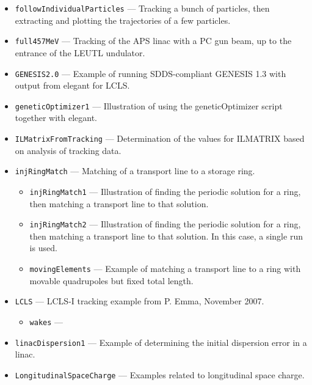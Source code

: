 \begin{itemize}
\begin{itemize}
\end{itemize}
\item \verb|followIndividualParticles| --- 
Tracking a bunch of particles, then extracting and plotting the trajectories of a few particles.

\item \verb|full457MeV| --- 
 Tracking of the APS linac with a PC gun beam, up to the entrance of the LEUTL undulator. 

\item \verb|GENESIS2.0| --- 
 Example of running SDDS-compliant GENESIS 1.3 with output from elegant for LCLS. 

\item \verb|geneticOptimizer1| --- 
 Illustration of using the geneticOptimizer script together with elegant. 

\item \verb|ILMatrixFromTracking| --- 
 Determination of the values for ILMATRIX based on analysis of tracking data. 

\item \verb|injRingMatch| --- 
 Matching of a transport line to a storage ring. 

\begin{itemize}
\item \verb|injRingMatch1| --- 
 Illustration of finding the periodic solution for a ring, then matching a transport line to that solution. 

\item \verb|injRingMatch2| --- 
 Illustration of finding the periodic solution for a ring, then matching a transport line to that solution. In this case, a single run is used. 

\item \verb|movingElements| --- 
 Example of matching a transport line to a ring with movable quadrupoles but fixed total length. 

\end{itemize}
\item \verb|LCLS| --- 
 LCLS-I tracking example from P. Emma, November 2007. 

\begin{itemize}
\item \verb|wakes| --- 
 

\end{itemize}
\item \verb|linacDispersion1| --- 
 Example of determining the initial dispersion error in a linac. 

\item \verb|LongitudinalSpaceCharge| --- 
Examples related to longitudinal space charge.


\end{itemize}
